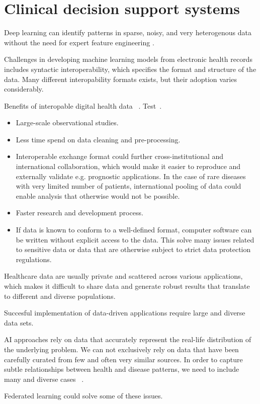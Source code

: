 \section{Clinical decision support systems}

Deep learning can identify patterns in sparse, noisy,
and very heterogenous data without the need for expert feature engineering
\cite{norgeotCall2019}.

Challenges in developing machine learning models from electronic health records
includes syntactic interoperability, 
which specifies the format and structure of the data.
Many different interopability formats exists, 
but their adoption varies considerably.

Benefits of interopable digital health data
~\autocite{lehneWhy2019}.
Test~\cite{lehneWhy2019}.

\begin{itemize}
    \item Large-scale observational studies.
    \item Less time spend on data cleaning and pre-processing.
    \item Interoperable exchange format could further cross-institutional
    and international collaboration, which would make it easier 
    to reproduce and externally validate e.g. prognostic applications.
    In the case of rare diseases with very limited number of patients, 
    international pooling of data could enable analysis
    that otherwise would not be possible.
    \item Faster research and development process.
    \item If data is known to conform to a well-defined format,
    computer software can be written without explicit access to the data.
    This solve many issues related to sensitive data or
    data that are otherwise subject to strict data protection regulations.
\end{itemize}


Healthcare data are usually private and scattered across various applications,
which makes it difficult to share data and generate robust results 
that translate to different and diverse populations.


Succesful implementation of data-driven applications
require large and diverse data sets.

AI approaches rely on data that accurately represent
the real-life distribution of the underlying problem.
We can not exclusively rely on data that have been carefully curated 
from few and often very similar sources. 
In order to capture subtle relationships 
between health and disease patterns,
we need to include many and diverse cases~%
\autocite{riekeFuture2020}.

Federated learning could solve some of these issues\autocite{riekeFuture2020}.





